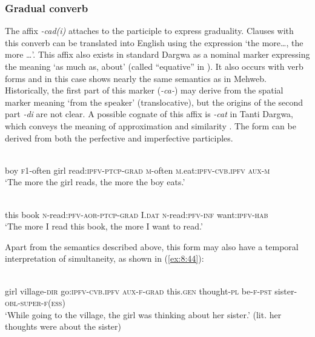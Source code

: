 ﻿\documentclass[output=paper]{langsci/langscibook}
\begin{document}
\subsubsection{Gradual converb}

The affix \emph{-cad(i)} attaches to the participle to express
graduality. Clauses with this converb can be translated into English
using the expression `the more\ldots{}, the more \ldots{}'. This affix
also exists in standard Dargwa as a nominal marker expressing the
meaning `as much as, about' (called ``equative'' in \citealt[25]{vandenberg2001}).
It also occurs with verb forms and in this case shows
nearly the same semantics as in Mehweb. Historically, the first part of
this marker (\emph{-ca-}) may derive from the spatial marker meaning
`from the speaker' (translocative), but the origins of the second
part \emph{-di} are not clear. A possible cognate of this affix is
\emph{-cat} in Tanti Dargwa, which conveys the meaning of
approximation and similarity \citep{sumbatova-lander2014:hse}. The form can be 
derived from both the perfective and imperfective participles.

\ea \label{ex:8:42} %
\\
boy \textsc{f1}-often girl read:\textsc{ipfv}-\textsc{ptcp}-\textsc{grad} \textsc{m}-often \textsc{m}.eat:\textsc{ipfv}-\textsc{cvb.ipfv} \textsc{aux}-\textsc{m}\\
\glt `The more the girl reads, the more the boy eats.'

\ex \label{ex:8:43} %
\\
this book \textsc{n}-read:\textsc{pfv}-\textsc{aor}-\textsc{ptcp}-\textsc{grad} I.\textsc{dat} \textsc{n}-read:\textsc{pfv}-\textsc{inf} want:\textsc{ipfv}-\textsc{hab}\\
\glt `The more I read this book, the more I want to read.'
\z

Apart from the semantics described above, this form may also have a
temporal interpretation of simultaneity, as shown in (\ref{ex:8:44}):

\ea \label{ex:8:44} %
\\ 
girl village-\textsc{dir} go:\textsc{ipfv}-\textsc{cvb.ipfv} \textsc{aux}-\textsc{f}-\textsc{grad} this.\textsc{gen} thought-\textsc{pl} {be}-\textsc{f}-\textsc{pst} sister-\textsc{obl}-\textsc{super}-\textsc{f}(\textsc{ess})\\
\glt `While going to the village, the girl was thinking about her sister.'
(lit. her thoughts were about the sister)
\z
\end{document}
